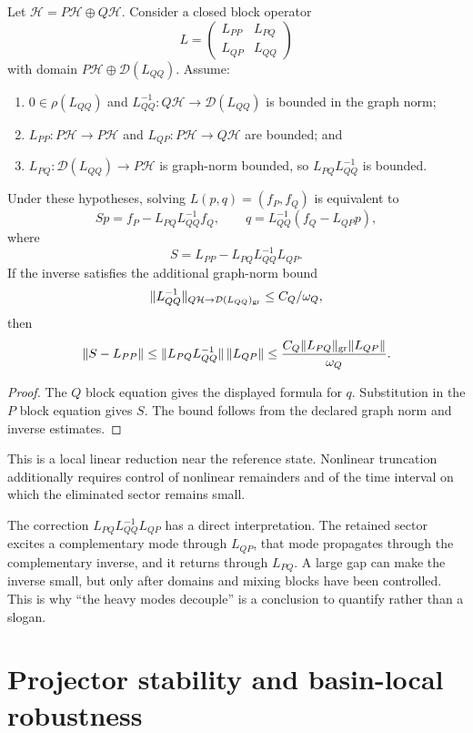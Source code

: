 \documentclass[11pt]{article}
\begin{document}
Let $\mathcal H=P\mathcal H\oplus Q\mathcal H$. Consider a closed block
operator
\[
 L=\begin{pmatrix}L_{PP}&L_{PQ}\\L_{QP}&L_{QQ}\end{pmatrix}
\]
with domain $P\mathcal H\oplus\mathcal D(L_{QQ})$. Assume:
\begin{enumerate}
\item $0\in\rho(L_{QQ})$ and
$L_{QQ}^{-1}:Q\mathcal H\to\mathcal D(L_{QQ})$ is bounded in the graph norm;
\item $L_{PP}:P\mathcal H\to P\mathcal H$ and
$L_{QP}:P\mathcal H\to Q\mathcal H$ are bounded; and
\item $L_{PQ}:\mathcal D(L_{QQ})\to P\mathcal H$ is graph-norm bounded, so
$L_{PQ}L_{QQ}^{-1}$ is bounded.
\end{enumerate}

\begin{theorem}\label{thm:feshbach}
Under these hypotheses, solving $L(p,q)=(f_P,f_Q)$ is equivalent to
\[
 S p=f_P-L_{PQ}L_{QQ}^{-1}f_Q,
 \qquad
 q=L_{QQ}^{-1}(f_Q-L_{QP}p),
\]
where
\[
 S=L_{PP}-L_{PQ}L_{QQ}^{-1}L_{QP}.
\]
If the inverse satisfies the additional graph-norm bound
\[
 \|L_{QQ}^{-1}\|_{Q\mathcal H\to\mathcal D(L_{QQ})_{\rm gr}}
 \le C_Q/\omega_Q,
\]
then
\[
 \|S-L_{PP}\|
 \le\|L_{PQ}L_{QQ}^{-1}\|\,\|L_{QP}\|
 \le\frac{C_Q\|L_{PQ}\|_{\rm gr}\|L_{QP}\|}{\omega_Q}.
\]
\end{theorem}

\begin{proof}
The $Q$ block equation gives the displayed formula for $q$. Substitution in
the $P$ block equation gives $S$. The bound follows from the declared graph
norm and inverse estimates.
\end{proof}

This is a local linear reduction near the reference state. Nonlinear
truncation additionally requires control of nonlinear remainders and of the
time interval on which the eliminated sector remains small.

The correction
$L_{PQ}L_{QQ}^{-1}L_{QP}$ has a direct interpretation. The retained sector
excites a complementary mode through $L_{QP}$, that mode propagates through
the complementary inverse, and it returns through $L_{PQ}$. A large gap can
make the inverse small, but only after domains and mixing blocks have been
controlled. This is why ``the heavy modes decouple'' is a conclusion to
quantify rather than a slogan.

\section{Projector stability and basin-local robustness}
\end{document}
